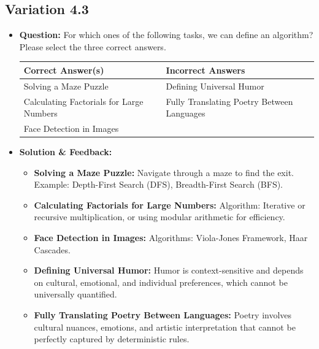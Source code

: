 \subsection{Variation 4.3}
\begin{itemize}
    \item \textbf{Question:} For which ones of the following tasks, we can define an algorithm? Please select the three correct answers.
    
    \begin{tabular}{|l|l|}
        \hline
        \textbf{Correct Answer(s)} & \textbf{Incorrect Answers} \\
        \hline
        Solving a Maze Puzzle & Defining Universal Humor \\
        Calculating Factorials for Large Numbers & Fully Translating Poetry Between Languages \\
        Face Detection in Images & \\
        \hline
    \end{tabular}
    
    \item \textbf{Solution \& Feedback:}
    \begin{itemize}
        \item \textbf{Solving a Maze Puzzle:} Navigate through a maze to find the exit. Example: Depth-First Search (DFS), Breadth-First Search (BFS).
        \item \textbf{Calculating Factorials for Large Numbers:} Algorithm: Iterative or recursive multiplication, or using modular arithmetic for efficiency.
        \item \textbf{Face Detection in Images:} Algorithms: Viola-Jones Framework, Haar Cascades.
        \item \textbf{Defining Universal Humor:} Humor is context-sensitive and depends on cultural, emotional, and individual preferences, which cannot be universally quantified.
        \item \textbf{Fully Translating Poetry Between Languages:} Poetry involves cultural nuances, emotions, and artistic interpretation that cannot be perfectly captured by deterministic rules.
    \end{itemize}
\end{itemize}

